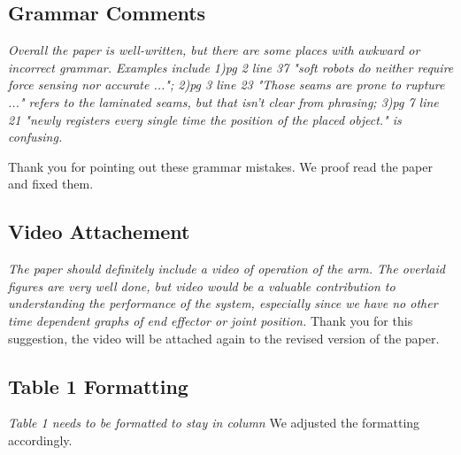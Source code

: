 \documentclass[letterpaper, 10 pt, twocolumn, conference]{article}
\begin{document}
\subsection{Grammar Comments}
\textit{Overall the paper is well-written, but there are some places with awkward or incorrect grammar. 
Examples include 
1)pg 2 line 37 "soft robots do neither require force sensing nor accurate ..."; 
2)pg 3 line 23 "Those seams are prone to rupture ..." refers to the laminated seams, but that isn't clear from phrasing; 
3)pg 7 line 21 "newly registers every single time the position of the placed object." is confusing.}

Thank you for pointing out these grammar mistakes. We proof read the paper and fixed them. 

\subsection{Video Attachement}
\textit{The paper should definitely include a video of operation of the arm. The overlaid figures are very well done, but video would be a valuable contribution to understanding the performance of the system, especially since we have no other time dependent graphs of end effector or joint position.}
%
Thank you for this suggestion, the video will be attached again to the revised version of the paper.
%
\subsection{Table 1 Formatting}
\textit{Table 1 needs to be formatted to stay in column}
%
We adjusted the formatting accordingly.
%
\end{document}
